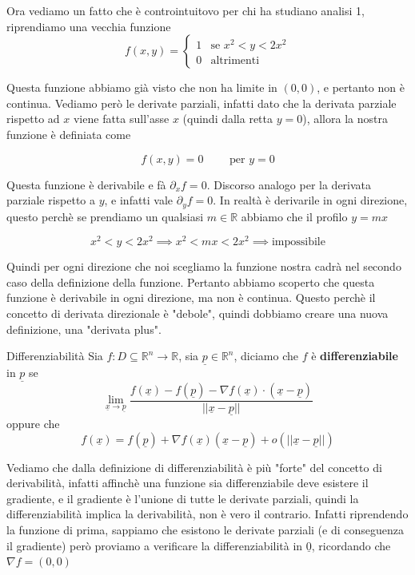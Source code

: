 \documentclass{rapport}
\begin{document}
Ora vediamo un fatto che è controintuitovo per chi ha studiano analisi 1, riprendiamo una vecchia funzione 
\[
f(x,y) = \begin{cases}
  1 &\text{se } x^2 < y < 2x^2 \\
  0 &\text{altrimenti}
\end{cases}
\]

Questa funzione abbiamo già visto che non ha limite in $(0,0)$, e pertanto non è continua. Vediamo però le derivate parziali, infatti dato che la derivata parziale rispetto ad $x$ viene fatta sull'asse $x$ (quindi dalla retta $y=0$), allora la nostra funzione è definiata come 

\[
f(x,y) = 0 \qquad \text{ per } y=0
\]

Questa funzione è derivabile e fà $\partial_x f = 0$. Discorso analogo per la derivata parziale rispetto a $y$, e infatti vale $\partial_y f = 0$. In realtà è derivarile in ogni direzione, questo perchè se prendiamo un qualsiasi $m\in\mathbb{R}$ abbiamo che il profilo $y=mx$ 

\[
x^2 < y < 2x^2 \implies x^2 < mx < 2x^2 \implies \text{impossibile}
\]

Quindi per ogni direzione che noi scegliamo la funzione nostra cadrà nel secondo caso della definizione della funzione. Pertanto abbiamo scoperto che questa funzione è derivabile in ogni direzione, ma non è  continua. Questo perchè il concetto di derivata direzionale è "debole", quindi dobbiamo creare una nuova definizione, una "derivata plus".


\begin{definizione}{Differenziabilità}{}
  Sia $f:D \subseteq \mathbb{R}^n \to \mathbb{R}$, sia $\underline{p} \in \mathbb{R}^n$, diciamo che $f$ è \textbf{differenziabile} in $\underline{p}$ se 
  \[
  \lim_{\underline{x} \to \underline{p}} \dfrac{f(\underline{x}) - f(\underline{p}) - \nabla f(\underline{x}) \cdot (\underline{x}-\underline{p})}{||\underline{x} -\underline{p}||}
  \]
  oppure che 
  \[
  f(\underline{x}) = f(\underline{p}) + \nabla f(\underline{x}) (\underline{x} - \underline{p}) + o(||\underline{x} - \underline{p}||) 
  \]
\end{definizione}

Vediamo che dalla definizione di differenziabilità è più "forte" del concetto di derivabilità, infatti affinchè una funzione sia differenziabile deve esistere il gradiente, e il gradiente è l'unione di tutte le derivate parziali, quindi la differenziabilità implica la derivabilità, non è vero il contrario. Infatti riprendendo la funzione di prima, sappiamo che esistono le derivate parziali (e di conseguenza il gradiente) però proviamo a verificare la differenziabilità in $\underline{0}$, ricordando che $\nabla f = (0,0 )$
\end{document}
